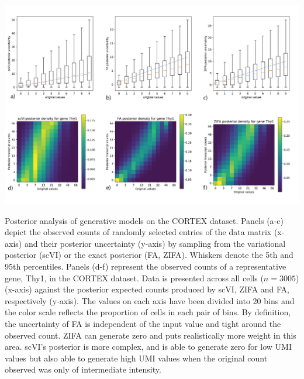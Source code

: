 \begin{suppfigure}[p]
\centering
\includegraphics[width=\textwidth]{figures/posterior_supplement.png}
\caption[Posterior analysis of generative models on the CORTEX dataset]{Posterior analysis of generative models on the CORTEX dataset. Panels (a-c) depict the observed counts of randomly selected entries of the data matrix (x-axis) and their posterior uncertainty (y-axis) by sampling from the variational posterior (scVI) or the exact posterior (FA, ZIFA). Whiskers denote the 5th and 95th percentiles. Panels (d-f) represent the observed counts of a representative gene, Thy1, in the CORTEX dataset. Data is presented across all cells ($n=3005$) (x-axis) against the posterior expected counts produced by scVI, ZIFA and FA, respectively (y-axis). The values on each axis have been divided into 20 bins and the color scale reflects the proportion of cells in each pair of bins. By definition, the uncertainty of FA is independent of the input value and tight around the observed count. ZIFA can generate zero and puts realistically more weight in this area. scVI's posterior is more complex, and is able to generate zero for low UMI values but also able to generate high UMI values when the original count observed was only of intermediate intensity.}
\label{scviposterior_supp}
\end{suppfigure}

